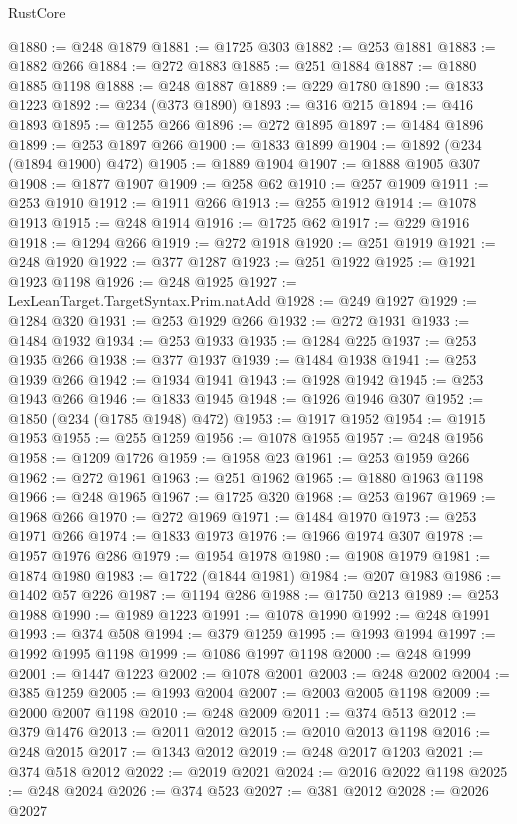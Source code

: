 \begin{lexlean}{RustCore}
\begin{coremodule}
@1880 := @248 @1879
@1881 := @1725 @303
@1882 := @253 @1881
@1883 := @1882 @266
@1884 := @272 @1883
@1885 := @251 @1884
@1887 := @1880 @1885 @1198
@1888 := @248 @1887
@1889 := @229 @1780
@1890 := @1833 @1223
@1892 := @234 (@373 @1890)
@1893 := @316 @215
@1894 := @416 @1893
@1895 := @1255 @266
@1896 := @272 @1895
@1897 := @1484 @1896
@1899 := @253 @1897 @266
@1900 := @1833 @1899
@1904 := @1892 (@234 (@1894 @1900) @472)
@1905 := @1889 @1904
@1907 := @1888 @1905 @307
@1908 := @1877 @1907
@1909 := @258 @62
@1910 := @257 @1909
@1911 := @253 @1910
@1912 := @1911 @266
@1913 := @255 @1912
@1914 := @1078 @1913
@1915 := @248 @1914
@1916 := @1725 @62
@1917 := @229 @1916
@1918 := @1294 @266
@1919 := @272 @1918
@1920 := @251 @1919
@1921 := @248 @1920
@1922 := @377 @1287
@1923 := @251 @1922
@1925 := @1921 @1923 @1198
@1926 := @248 @1925
@1927 := LexLeanTarget.TargetSyntax.Prim.natAdd
@1928 := @249 @1927
@1929 := @1284 @320
@1931 := @253 @1929 @266
@1932 := @272 @1931
@1933 := @1484 @1932
@1934 := @253 @1933
@1935 := @1284 @225
@1937 := @253 @1935 @266
@1938 := @377 @1937
@1939 := @1484 @1938
@1941 := @253 @1939 @266
@1942 := @1934 @1941
@1943 := @1928 @1942
@1945 := @253 @1943 @266
@1946 := @1833 @1945
@1948 := @1926 @1946 @307
@1952 := @1850 (@234 (@1785 @1948) @472)
@1953 := @1917 @1952
@1954 := @1915 @1953
@1955 := @255 @1259
@1956 := @1078 @1955
@1957 := @248 @1956
@1958 := @1209 @1726
@1959 := @1958 @23
@1961 := @253 @1959 @266
@1962 := @272 @1961
@1963 := @251 @1962
@1965 := @1880 @1963 @1198
@1966 := @248 @1965
@1967 := @1725 @320
@1968 := @253 @1967
@1969 := @1968 @266
@1970 := @272 @1969
@1971 := @1484 @1970
@1973 := @253 @1971 @266
@1974 := @1833 @1973
@1976 := @1966 @1974 @307
@1978 := @1957 @1976 @286
@1979 := @1954 @1978
@1980 := @1908 @1979
@1981 := @1874 @1980
@1983 := @1722 (@1844 @1981)
@1984 := @207 @1983
@1986 := @1402 @57 @226
@1987 := @1194 @286
@1988 := @1750 @213
@1989 := @253 @1988
@1990 := @1989 @1223
@1991 := @1078 @1990
@1992 := @248 @1991
@1993 := @374 @508
@1994 := @379 @1259
@1995 := @1993 @1994
@1997 := @1992 @1995 @1198
@1999 := @1086 @1997 @1198
@2000 := @248 @1999
@2001 := @1447 @1223
@2002 := @1078 @2001
@2003 := @248 @2002
@2004 := @385 @1259
@2005 := @1993 @2004
@2007 := @2003 @2005 @1198
@2009 := @2000 @2007 @1198
@2010 := @248 @2009
@2011 := @374 @513
@2012 := @379 @1476
@2013 := @2011 @2012
@2015 := @2010 @2013 @1198
@2016 := @248 @2015
@2017 := @1343 @2012
@2019 := @248 @2017 @1203
@2021 := @374 @518 @2012
@2022 := @2019 @2021
@2024 := @2016 @2022 @1198
@2025 := @248 @2024
@2026 := @374 @523
@2027 := @381 @2012
@2028 := @2026 @2027

\end{coremodule}
\end{lexlean}
